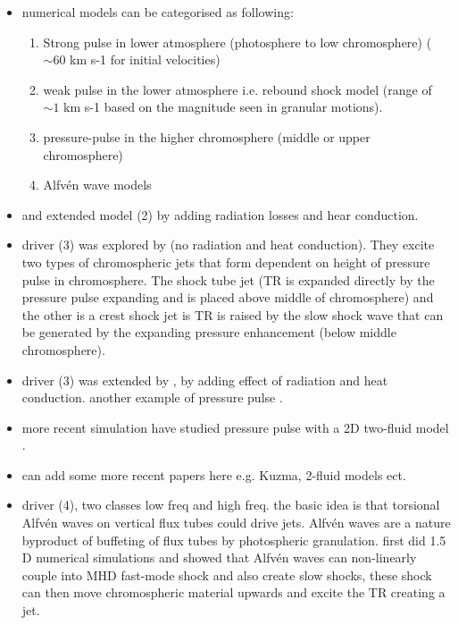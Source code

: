 \documentclass[12pt]{ociamthesis}
\newcommand{\Alfven}{Alfv\'{e}n }
\begin{document}
\begin{itemize}
\item numerical models can be categorised as following: 
\begin{enumerate}
\item Strong pulse in lower atmosphere (photosphere to low chromosphere) ($\sim 60$ km s-1 for initial velocities)
\item weak pulse in the lower atmosphere i.e. rebound shock model (range of $\sim 1$ km s-1 based on the magnitude seen in granular motions). 
\item pressure-pulse in the higher chromosphere (middle or upper chromosphere)
\item \Alfven wave models 
\end{enumerate}
\item \cite{Sterling1990ApJ349647S} and \cite{Cheng1992AA266537C} extended model (2) by adding radiation losses and hear conduction. 
\item driver (3) was explored by \cite{Shibata1982} (no radiation and heat conduction). They excite two types of chromospheric jets that form dependent on height of pressure pulse in chromosphere. The shock tube jet (TR is expanded directly by the pressure pulse expanding and is placed above middle of chromosphere) and the other is a crest shock jet is TR is raised by the slow shock wave that can be generated by the expanding pressure enhancement (below middle chromosphere). 
\item driver (3) was extended by \cite{Sterling1990ApJ349647S,Sterling1993ApJ407778S,Cheng1992AA266537C,Heggland2007ApJ6661277H,kuzma2017AA597A133K}, by adding effect of radiation and heat conduction. another example of pressure pulse \cite{Smirnova2016SoPh2913207S}. 
\item more recent simulation have studied pressure pulse with a 2D two-fluid model \cite{kuzma2017ApJ84978K}.   
\item can add some more recent papers here e.g. Kuzma, 2-fluid models ect.
\item driver (4), two classes low freq and high freq. the basic idea is that torsional \Alfven waves on vertical flux tubes could drive jets. \Alfven waves are a nature byproduct of buffeting of flux tubes by photospheric granulation. \cite{Hollweg1982SoPh7535H,Hollweg1992ApJ389731H} first did 1.5 D numerical simulations and showed that \Alfven waves can non-linearly couple into MHD fast-mode shock and also create slow shocks, these shock can then move chromospheric material upwards and excite the TR creating a jet. 

\end{itemize}
\end{document}
